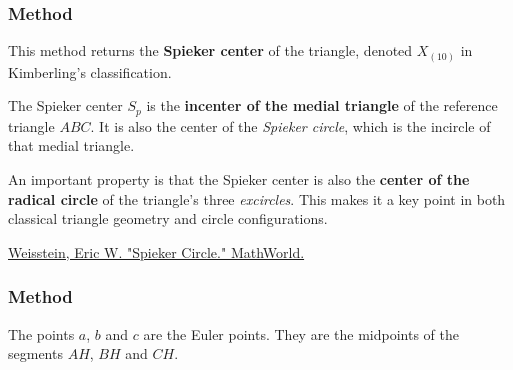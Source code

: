 \subsubsection{Method }
\label{ssub:method_triangle_spieker_center}

This method returns the \textbf{Spieker center} of the triangle, denoted $X_{(10)}$ in Kimberling’s classification.

\medskip
\noindent
The Spieker center $S_p$ is the \textbf{incenter of the medial triangle} of the reference triangle $ABC$. It is also the center of the \emph{Spieker circle}, which is the incircle of that medial triangle.

\medskip
\noindent
An important property is that the Spieker center is also the \textbf{center of the radical circle} of the triangle’s three \emph{excircles}. This makes it a key point in both classical triangle geometry and circle configurations.
\begin{flushright}
\small
\href{https://mathworld.wolfram.com/SpiekerCircle.html}{Weisstein, Eric W. "Spieker Circle." MathWorld.}
\end{flushright}

\vspace{1em}

\begin{tkzexample}[latex=.5\textwidth]
\end{tkzexample}

\subsubsection{Method } %
\label{ssub:method_triangle_euler__points}

The points $a$, $b$ and $c$ are the Euler points. They are the midpoints of the segments $AH$, $BH$ and $CH$.


